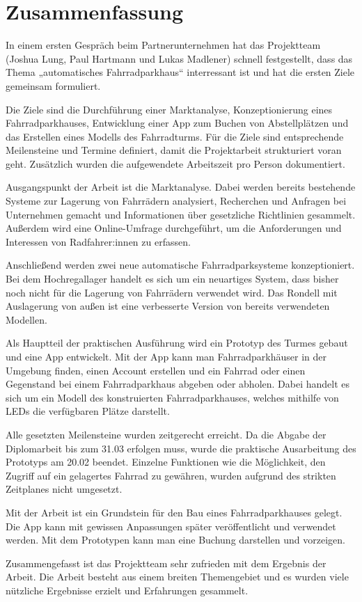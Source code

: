 \section{Zusammenfassung}

In einem ersten Gespräch beim Partnerunternehmen hat das Projektteam (Joshua Lung, Paul Hartmann und Lukas Madlener) schnell festgestellt, dass das Thema „automatisches Fahrradparkhaus“ interressant ist und hat die ersten Ziele gemeinsam formuliert.

\noindent Die Ziele sind die Durchführung einer Marktanalyse, Konzeptionierung eines Fahrradparkhauses, Entwicklung einer App zum Buchen von Abstellplätzen und das Erstellen eines Modells des Fahrradturms. Für die Ziele sind entsprechende Meilensteine und Termine definiert, damit die Projektarbeit strukturiert voran geht. Zusätzlich wurden die aufgewendete Arbeitszeit pro Person dokumentiert.

\bigskip


\noindent Ausgangspunkt der Arbeit ist die Marktanalyse. Dabei werden bereits bestehende Systeme zur Lagerung von Fahrrädern analysiert, Recherchen und Anfragen bei Unternehmen gemacht und Informationen über gesetzliche Richtlinien gesammelt. Außerdem wird eine Online-Umfrage durchgeführt, um die Anforderungen und Interessen von Radfahrer:innen zu erfassen.

\noindent Anschließend werden zwei neue automatische Fahrradparksysteme konzeptioniert. Bei dem Hochregallager handelt es sich um ein neuartiges System, dass bisher noch nicht für die Lagerung von Fahrrädern verwendet wird. Das Rondell mit Auslagerung von außen ist eine verbesserte Version von bereits verwendeten Modellen.

\noindent Als Hauptteil der praktischen Ausführung wird ein Prototyp des Turmes gebaut und eine App entwickelt. Mit der App kann man Fahrradparkhäuser in der Umgebung finden, einen Account erstellen und ein Fahrrad oder einen Gegenstand bei einem Fahrradparkhaus abgeben oder abholen. Dabei handelt es sich um ein Modell des konstruierten Fahrradparkhauses, welches mithilfe von LEDs die verfügbaren Plätze darstellt.

\noindent Alle gesetzten Meilensteine wurden zeitgerecht erreicht. Da die Abgabe der Diplomarbeit bis zum 31.03 erfolgen muss, wurde die praktische Ausarbeitung des Prototyps am 20.02 beendet. Einzelne Funktionen wie die Möglichkeit, den Zugriff auf ein gelagertes Fahrrad zu gewähren, wurden aufgrund des strikten Zeitplanes nicht umgesetzt.

\bigskip


\noindent Mit der Arbeit ist ein Grundstein für den Bau eines Fahrradparkhauses gelegt. Die App kann mit gewissen Anpassungen später veröffentlicht und verwendet werden. Mit dem Prototypen kann man eine Buchung darstellen und vorzeigen.

\noindent Zusammengefasst ist das Projektteam sehr zufrieden mit dem Ergebnis der Arbeit. Die Arbeit besteht aus einem breiten Themengebiet und es wurden viele nützliche Ergebnisse erzielt und Erfahrungen gesammelt.
